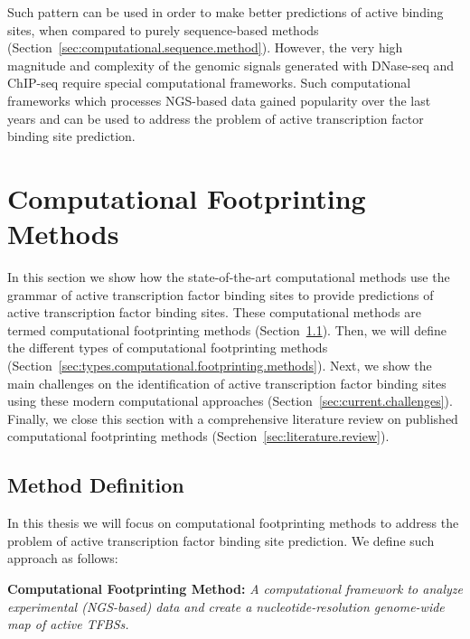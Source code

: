 Such pattern can be used in order to make better predictions of active binding sites, when compared to purely sequence-based methods (Section~\ref{sec:computational.sequence.method}). However, the very high magnitude and complexity of the genomic signals generated with DNase-seq and ChIP-seq require special computational frameworks. Such computational frameworks which processes NGS-based data gained popularity over the last years and can be used to address the problem of active transcription factor binding site prediction.

\section{Computational Footprinting Methods}
\label{sec:computational.footprinting.methods}

In this section we show how the state-of-the-art computational methods use the grammar of active transcription factor binding sites to provide predictions of active transcription factor binding sites. These computational methods are termed computational footprinting methods (Section~\ref{sec:method.definition}). Then, we will define the different types of computational footprinting methods (Section~\ref{sec:types.computational.footprinting.methods}). Next, we show the main challenges on the identification of active transcription factor binding sites using these modern computational approaches (Section~\ref{sec:current.challenges}). Finally, we close this section with a comprehensive literature review on published computational footprinting methods (Section~\ref{sec:literature.review}).

\subsection{Method Definition}
\label{sec:method.definition}

In this thesis we will focus on computational footprinting methods to address the problem of active transcription factor binding site prediction. We define such approach as follows:

\vspace{0.5cm}
\noindent
\textbf{Computational Footprinting Method:} \emph{A computational framework to analyze experimental (NGS-based) data and create a nucleotide-resolution genome-wide map of active TFBSs.}
\vspace{0.45cm}

